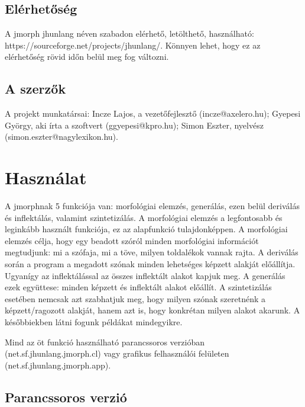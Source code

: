 \documentclass{article}
\begin{document}
\subsection{El\'erhet\H{o}s\'eg}

A jmorph jhunlang n\'even szabadon el\'erhet\H{o}, let\"olthet\H{o}, haszn\'alhat\'o: \mbox{https://sourceforge.net/projects/jhunlang/}. K\"onnyen lehet, hogy ez az el\'erhet\H{o}s\'eg r\"ovid id\H{o}n bel\"ul meg fog v\'altozni. \par

\subsection{A szerz\H{o}k}

A projekt munkat\'arsai: Incze Lajos, a vezet\H{o}fejleszt\H{o} (\mbox{incze@axelero.hu}); Gyepesi Gy\"orgy, aki \'{i}rta a szoftvert (\mbox{ggyepesi@kpro.hu}); Simon Eszter, nyelv\'esz (\mbox{simon.eszter@nagylexikon.hu}). \par

\section{Haszn\'alat}

A jmorphnak 5 funkci\'oja van: morfol\'ogiai elemz\'es, gener\'al\'as, ezen bel\"ul deriv\'al\'as \'es inflekt\'al\'as, valamint szintetiz\'al\'as. A morfol\'ogiai elemz\'es a legfontosabb \'es legink\'abb haszn\'alt funkci\'oja, ez az alapfunkci\'o tulajdonk\'eppen. A morfol\'ogiai elemz\'es c\'elja, hogy egy beadott sz\'or\'ol minden morfol\'ogiai inform\'aci\'ot megtudjunk: mi a sz\'ofaja, mi a t\"ove, milyen toldal\'ekok vannak rajta. A deriv\'al\'as sor\'an a program a megadott sz\'onak minden lehets\'eges k\'epzett alakj\'at el\H{o}\'all\'{i}tja. Ugyan\'{i}gy az inflekt\'al\'assal az \"osszes inflekt\'alt alakot kapjuk meg. A gener\'al\'as ezek egy\"uttese: minden k\'epzett \'es inflekt\'alt alakot el\H{o}\'all\'{i}t. A szintetiz\'al\'as eset\'eben nemcsak azt szabhatjuk meg, hogy milyen sz\'onak szeretn\'enk a k\'epzett/ragozott alakj\'at, hanem azt is, hogy konkr\'etan milyen alakot akarunk. A k\'es\H{o}bbiekben l\'atni fogunk p\'eld\'akat mindegyikre. \par
Mind az \"ot funkci\'o haszn\'alhat\'o parancssoros verzi\'oban (net.sf.jhunlang.jmorph.cl) vagy grafikus felhaszn\'al\'oi fel\"uleten (net.sf.jhunlang.jmorph.app).


\subsection{Parancssoros verzi\'o}
\end{document}
